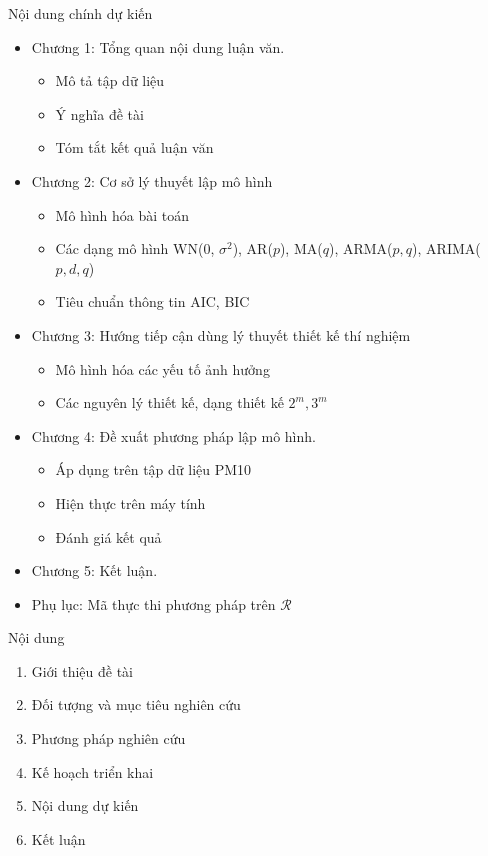 \documentclass{beamer}
\begin{document}
\begin{frame}{Nội dung chính dự kiến}
\begin{itemize}
\item Chương 1: Tổng quan nội dung luận văn.
	\begin{itemize}
	\item Mô tả tập dữ liệu
	\item Ý nghĩa đề tài
	\item Tóm tắt kết quả luận văn
	\end{itemize}
\item Chương 2: Cơ sở lý thuyết lập mô hình
	\begin{itemize}
	\item Mô hình hóa bài toán
	\item Các dạng mô hình WN(0, \(\sigma^2\)),
	AR(\(p\)), MA(\(q\)), ARMA(\(p, q\)), ARIMA(\(p, d, q\))
	\item Tiêu chuẩn thông tin AIC, BIC
	\end{itemize}
\item Chương 3: Hướng tiếp cận dùng lý thuyết thiết kế thí nghiệm
	\begin{itemize}
	\item Mô hình hóa các yếu tố ảnh hưởng
	\item Các nguyên lý thiết kế, dạng thiết kế  \(2^m, 3^m\)
	\end{itemize}
\item Chương 4: Đề xuất phương pháp lập mô hình.
	\begin{itemize}
	\item Áp dụng trên tập dữ liệu PM10
	\item Hiện thực trên máy tính
	\item Đánh giá kết quả
	\end{itemize}
\item Chương 5: Kết luận.
\item Phụ lục: Mã thực thi phương pháp trên \(\mathcal{R}\)
\end{itemize}
\end{frame}

\begin{frame}{Nội dung}
\begin{enumerate}
\item Giới thiệu đề tài
\item Đối tượng và mục tiêu nghiên cứu
\item Phương pháp nghiên cứu
\item Kế hoạch triển khai
\item Nội dung dự kiến
\item {\color{red}Kết luận}
\end{enumerate}
\end{frame}
\end{document}

